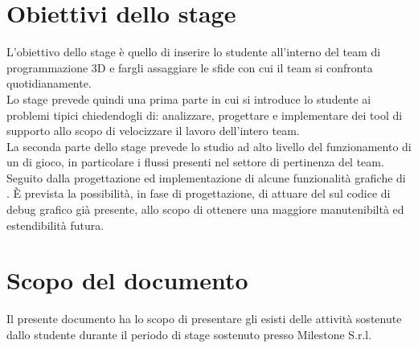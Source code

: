 \section{Obiettivi dello stage}

L'obiettivo dello stage è quello di inserire lo studente all'interno del team di programmazione 3D e fargli assaggiare le sfide con cui il team si confronta quotidianamente.\\

Lo stage prevede quindi una prima parte in cui si introduce lo studente ai problemi tipici chiedendogli di: analizzare, progettare e implementare dei tool di supporto allo scopo di velocizzare il lavoro dell'intero team.\\

La seconda parte dello stage prevede lo studio ad alto livello del funzionamento di un  di gioco, in particolare i flussi presenti nel settore di pertinenza del team. Seguito dalla progettazione ed implementazione di alcune funzionalità grafiche di . È prevista la possibilità, in fase di progettazione, di attuare del  sul codice di debug grafico già presente, allo scopo di ottenere una maggiore manutenibiltà ed estendibilità futura.

\section{Scopo del documento}

Il presente documento ha lo scopo di presentare gli esisti delle attività sostenute dallo studente durante il periodo di stage sostenuto presso Milestone S.r.l.\\

